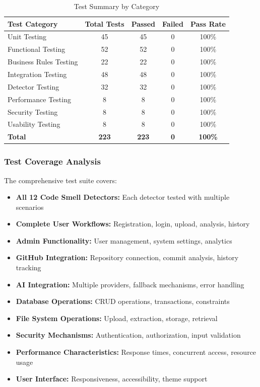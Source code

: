 \documentclass[12pt,a4paper]{article}
\begin{document}
    \begin{table}[H]
        \caption{Test Summary by Category}
        \begin{tabular}{|l|c|c|c|c|}
            \hline
            \textbf{Test Category} & \textbf{Total Tests} & \textbf{Passed} & \textbf{Failed} & \textbf{Pass Rate} \\
            \hline
            Unit Testing & 45 & 45 & 0 & 100\% \\
            Functional Testing & 52 & 52 & 0 & 100\% \\
            Business Rules Testing & 22 & 22 & 0 & 100\% \\
            Integration Testing & 48 & 48 & 0 & 100\% \\
            Detector Testing & 32 & 32 & 0 & 100\% \\
            Performance Testing & 8 & 8 & 0 & 100\% \\
            Security Testing & 8 & 8 & 0 & 100\% \\
            Usability Testing & 8 & 8 & 0 & 100\% \\
            \hline
            \textbf{Total} & \textbf{223} & \textbf{223} & \textbf{0} & \textbf{100\%} \\
            \hline
        \end{tabular}
    \end{table}

    \subsubsection{Test Coverage Analysis}

    The comprehensive test suite covers:

    \begin{itemize}[leftmargin=0.5in]
        \item \textbf{All 12 Code Smell Detectors:} Each detector tested with multiple scenarios
        \item \textbf{Complete User Workflows:} Registration, login, upload, analysis, history
        \item \textbf{Admin Functionality:} User management, system settings, analytics
        \item \textbf{GitHub Integration:} Repository connection, commit analysis, history tracking
        \item \textbf{AI Integration:} Multiple providers, fallback mechanisms, error handling
        \item \textbf{Database Operations:} CRUD operations, transactions, constraints
        \item \textbf{File System Operations:} Upload, extraction, storage, retrieval
        \item \textbf{Security Mechanisms:} Authentication, authorization, input validation
        \item \textbf{Performance Characteristics:} Response times, concurrent access, resource usage
        \item \textbf{User Interface:} Responsiveness, accessibility, theme support
    \end{itemize}
\end{document}
